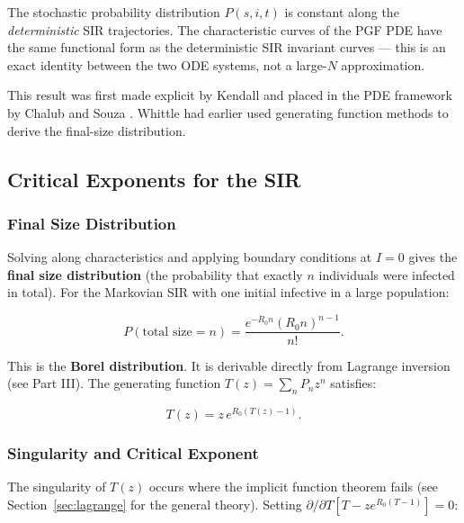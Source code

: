 \documentclass[11pt,a4paper]{article}
\theoremstyle{definition}
\begin{document}
\begin{keybox}
The stochastic probability distribution $P(s,i,t)$ is constant along the
\emph{deterministic} SIR trajectories. The characteristic curves of the PGF PDE
have the same functional form as the deterministic SIR invariant curves ---
this is an exact identity between the two ODE systems, not a large-$N$ approximation.
\end{keybox}

This result was first made explicit by Kendall \cite{kendall1956} and placed in the
PDE framework by Chalub and Souza \cite{chalub2011}. Whittle \cite{whittle1955} had
earlier used generating function methods to derive the final-size distribution.

\subsection{Critical Exponents for the SIR}

\subsubsection{Final Size Distribution}

Solving along characteristics and applying boundary conditions at $I = 0$ gives the
\textbf{final size distribution} (the probability that exactly $n$ individuals were
infected in total). For the Markovian SIR with one initial infective in a large
population:

\begin{equation}
  P(\text{total size} = n) = \frac{e^{-R_0 n}(R_0 n)^{n-1}}{n!}.
  \label{eq:sir_finalsize}
\end{equation}

This is the \textbf{Borel distribution}. It is derivable directly from Lagrange
inversion (see Part III). The generating function $T(z) = \sum_n P_n z^n$ satisfies:

\begin{equation}
  T(z) = z\, e^{R_0(T(z) - 1)}.
  \label{eq:sir_lagrange}
\end{equation}

\subsubsection{Singularity and Critical Exponent}

The singularity of $T(z)$ occurs where the implicit function theorem fails
(see Section~\ref{sec:lagrange} for the general theory). Setting
$\partial/\partial T[T - ze^{R_0(T-1)}] = 0$:
\end{document}
